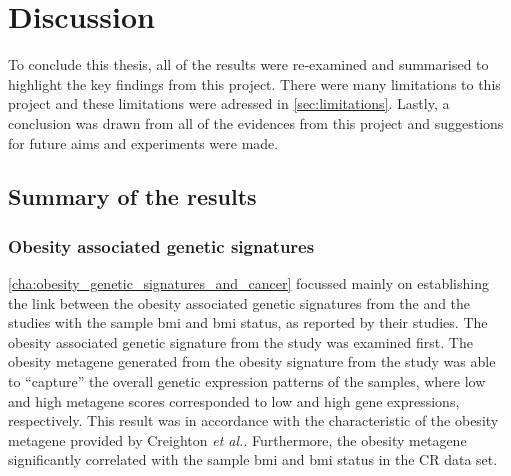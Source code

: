 \chapter{Discussion}
\label{cha:discussion}

To conclude this thesis, all of the results were re-examined and summarised to highlight the key findings from this project.
There were many limitations to this project and these limitations were adressed in \cref{sec:limitations}.
Lastly, a conclusion was drawn from all of the evidences from this project and suggestions for future aims and experiments were made.


\section{Summary of the results}
\label{sec:summary_of_the_results}



\subsection{Obesity associated genetic signatures}
\label{sub:obesity_associated_genetic_signatures}

\cref{cha:obesity_genetic_signatures_and_cancer} focussed mainly on establishing the link between the obesity associated genetic signatures from the \citet{Creighton2012} and the \citet{Fuentes-Mattei2014} studies with the sample \gls{bmi} and \gls{bmi} status, as reported by their studies.
The obesity associated genetic signature from the \citet{Creighton2012} study was examined first.
The obesity metagene generated from the obesity signature from the \citet{Creighton2012} study was able to ``capture'' the overall genetic expression patterns of the samples, where low and high metagene scores  corresponded to low and high gene expressions, respectively.
This result was in accordance with the characteristic of the obesity metagene provided by Creighton \textit{et al.}.
Furthermore, the obesity metagene significantly correlated with the sample \gls{bmi} and \gls{bmi} status in the CR data set.

